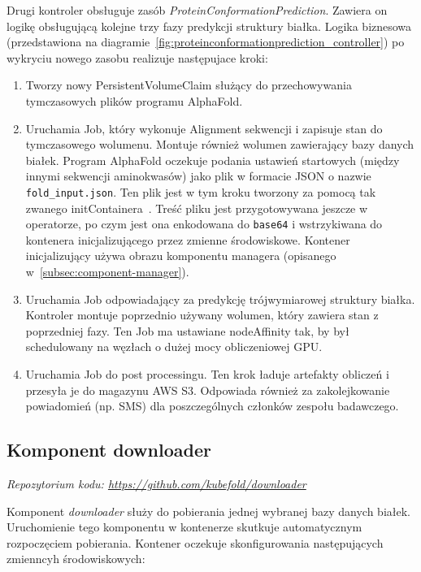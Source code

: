Drugi kontroler obsługuje zasób \textit{ProteinConformationPrediction}.
Zawiera on logikę obsługującą kolejne trzy fazy predykcji struktury białka.
Logika biznesowa (przedstawiona na diagramie~\ref{fig:proteinconformationprediction_controller}) po wykryciu nowego zasobu realizuje następujace kroki:
\begin{enumerate}
    \item Tworzy nowy PersistentVolumeClaim służący do przechowywania tymczasowych plików programu AlphaFold.
    \item Uruchamia Job, który wykonuje Alignment sekwencji i zapisuje stan do tymczasowego wolumenu.
    Montuje również wolumen zawierający bazy danych białek.
    Program AlphaFold oczekuje podania ustawień startowych (między innymi sekwencji aminokwasów) jako plik w formacie JSON o nazwie \texttt{fold\_input.json}.
    Ten plik jest w tym kroku tworzony za pomocą tak zwanego initContainera~\cite{k8s_init_containers}.
    Treść pliku jest przygotowywana jeszcze w operatorze, po czym jest ona enkodowana do \texttt{base64} i wstrzykiwana do kontenera inicjalizującego przez zmienne środowiskowe.
    Kontener inicjalizujący używa obrazu komponentu managera (opisanego w~\ref{subsec:component-manager}).
    \item Uruchamia Job odpowiadający za predykcję trójwymiarowej struktury białka.
    Kontroler montuje poprzednio używany wolumen, który zawiera stan z poprzedniej fazy.
    Ten Job ma ustawiane nodeAffinity tak, by był schedulowany na węzłach o dużej mocy obliczeniowej GPU.
    \item Uruchamia Job do post processingu.
    Ten krok ładuje artefakty obliczeń i przesyła je do magazynu AWS S3. Odpowiada również za zakolejkowanie powiadomień (np.
    SMS) dla poszczególnych członków zespołu badawczego.
\end{enumerate}

\subsection{Komponent downloader}\label{subsec:component-downloader}
\textit{Repozytorium kodu: \url{https://github.com/kubefold/downloader}}

Komponent \textit{downloader} służy do pobierania jednej wybranej bazy danych białek.
Uruchomienie tego komponentu w kontenerze skutkuje automatycznym rozpoczęciem pobierania.
Kontener oczekuje skonfigurowania następujących zmienncyh środowiskowych:

